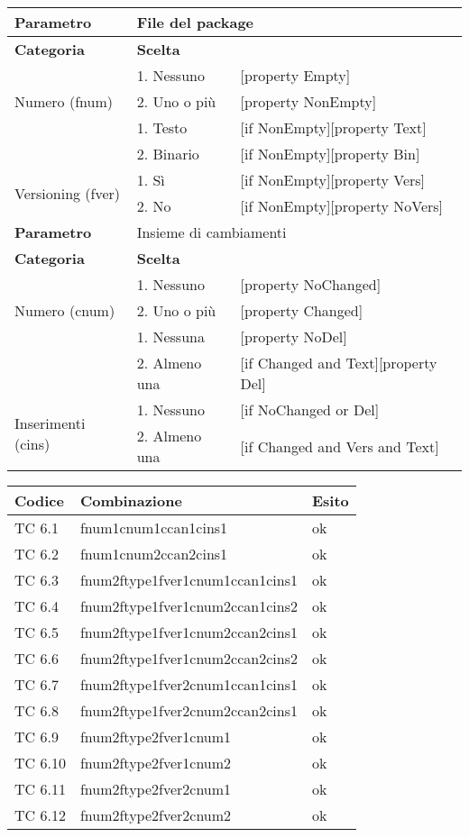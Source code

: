 \begin{tabular}{|p{4cm}|p{4cm}p{5cm}|}
	\hline
	\cellcolor{Gray} \textbf{Parametro}				& \multicolumn{2}{l|}{File del package}							\tabularnewline
	\hline
	\rowcolor{Gray}
	\textbf{Categoria}						& \textbf{Scelta}			&						\tabularnewline
	\hline
	\multirow{3}{*}{Numero (fnum)}					& 1. Nessuno				&	[property Empty] 			\tabularnewline
									\cline{2-3}
									& 2. Uno o più				&	[property NonEmpty]			\tabularnewline
	\hline
	\multirow{2}{*}{Tipo (ftype)}					& 1. Testo				&	[if NonEmpty][property Text] 		\tabularnewline
									\cline{2-3}
									& 2. Binario				&	[if NonEmpty][property Bin]		\tabularnewline
	\hline
	\multirow{2}{*}{Versioning (fver)}				& 1. Sì					&	[if NonEmpty][property Vers] 		\tabularnewline
									\cline{2-3}
									& 2. No					&	[if NonEmpty][property NoVers]		\tabularnewline
	\hline
	
	\cellcolor{Gray} \textbf{Parametro}				& \multicolumn{2}{l|}{Insieme di cambiamenti}						\tabularnewline
	\hline
	\rowcolor{Gray}
	\textbf{Categoria}						& \textbf{Scelta}			&						\tabularnewline
	\hline
	\multirow{3}{*}{Numero (cnum)}					& 1. Nessuno				&	[property NoChanged] 			\tabularnewline
									\cline{2-3}
									& 2. Uno o più				&	[property Changed]			\tabularnewline
	\hline
	\multirow{2}{*}{Cancellazioni (ccan)}				& 1. Nessuna				&	[property NoDel]			\tabularnewline
									\cline{2-3}
									& 2. Almeno una				&	[if Changed and Text][property Del]		\tabularnewline
	\hline
	\multirow{2}{*}{Inserimenti (cins)}				& 1. Nessuno				&	[if NoChanged or Del]			\tabularnewline
									\cline{2-3}
									& 2. Almeno una				&	[if Changed and Vers and Text] 		\tabularnewline
									
	\hline
	
	\hline
\end{tabular}

\vspace{1cm}

\begin{tabular}{|p{3cm}|p{7cm}|p{3cm}|}
	\hline
	\rowcolor{Gray}
	\textbf{Codice} & \textbf{Combinazione} & \textbf{Esito}\tabularnewline
	\hline
	TC 6.1			& fnum1cnum1ccan1cins1					& ok \tabularnewline
	\hline
	TC 6.2			& fnum1cnum2ccan2cins1					& ok \tabularnewline
	\hline
	TC 6.3			& fnum2ftype1fver1cnum1ccan1cins1			& ok \tabularnewline
	\hline
	TC 6.4			& fnum2ftype1fver1cnum2ccan1cins2			& ok \tabularnewline
	\hline
	TC 6.5			& fnum2ftype1fver1cnum2ccan2cins1			& ok \tabularnewline
	\hline
	TC 6.6			& fnum2ftype1fver1cnum2ccan2cins2			& ok \tabularnewline
	\hline
	TC 6.7			& fnum2ftype1fver2cnum1ccan1cins1			& ok \tabularnewline
	\hline
	TC 6.8			& fnum2ftype1fver2cnum2ccan2cins1			& ok \tabularnewline
	\hline
	TC 6.9			& fnum2ftype2fver1cnum1					& ok \tabularnewline
	\hline
	TC 6.10			& fnum2ftype2fver1cnum2					& ok \tabularnewline
	\hline
	TC 6.11			& fnum2ftype2fver2cnum1					& ok \tabularnewline
	\hline
	TC 6.12			& fnum2ftype2fver2cnum2					& ok \tabularnewline
	\hline
\end{tabular}
\clearpage




